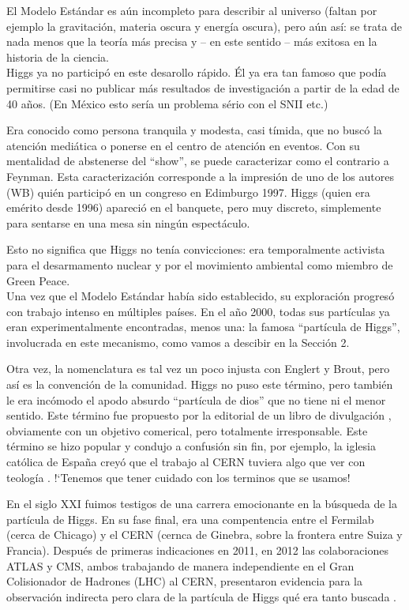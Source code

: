 \documentclass[12pt]{article}
\begin{document}
El Modelo Estándar es aún incompleto para describir al universo (faltan por ejemplo
la gravitaci\'on, materia oscura y energ\'ia oscura), pero
a\'un as\'i: se trata de nada menos que la teor\'ia m\'as precisa
y -- en este sentido -- m\'as exitosa en la historia de la ciencia.\\
 
Higgs ya no particip\'o en este desarollo r\'apido. \'El ya era
tan famoso que pod\'ia permitirse casi no publicar m\'as resultados
de investigaci\'on a partir de la edad de 40 a\~{n}os.
(En M\'exico esto ser\'ia un problema s\'erio con el SNII etc.)
 
Era conocido como persona tranquila y modesta, casi t\'imida,
que no busc\'o la atenci\'on medi\'atica o ponerse en el centro de atenci\'on en eventos. Con su mentalidad de abstenerse del
``show'', se puede caracterizar como el contrario a Feynman.
Esta caracterizaci\'on corresponde a la impresi\'on de uno de los
autores (WB) qui\'en particip\'o en un congreso en Edimburgo 1997.
Higgs (quien era em\'erito desde 1996) apareci\'o en el banquete,
pero muy discreto, simplemente para sentarse en una mesa sin
ning\'un espect\'aculo.

Esto no significa que Higgs no ten\'ia convicciones: era
temporalmente activista para el desarmamento nuclear y
por el movimiento ambiental como miembro de Green Peace. \\

Una vez que el Modelo Estándar había sido establecido, su exploraci\'on
progresó con trabajo intenso en m\'ultiples pa\'ises.
En el a\~no 2000, todas sus part\'iculas ya eran experimentalmente
encontradas, menos una: la famosa ``part\'icula de Higgs'', involucrada
en este mecanismo, como vamos a descibir en la Secci\'on 2.

Otra vez, la nomenclatura es tal vez un poco injusta con Englert y
Brout, pero as\'i es la convenci\'on de la comunidad.
Higgs no puso este t\'ermino, pero tambi\'en le era incómodo el
apodo absurdo ``part\'icula de dios'' que no tiene ni el menor sentido.
Este término fue propuesto por la editorial de un libro de divulgaci\'on \cite{Lederman},
obviamente con un objetivo comerical, pero totalmente irresponsable.
Este t\'ermino se hizo popular y condujo a confusi\'on sin fin,
por ejemplo, la iglesia cat\'olica de Espa\~na crey\'o que el trabajo al
CERN tuviera algo que ver con teolog\'ia \cite{boson}. !`Tenemos que
tener cuidado con los terminos que se usamos!

En el siglo XXI fuimos testigos de una carrera emocionante en la
b\'usqueda de la part\'icula de Higgs. En su fase final, era una
compentencia entre el Fermilab (cerca de Chicago) y el CERN
(cernca de Ginebra, sobre la frontera entre Suiza y Francia).
Despu\'es de primeras indicaciones en 2011, en 2012 las
colaboraciones ATLAS y CMS, ambos trabajando de manera independiente
en el Gran Colisionador de Hadrones (LHC) al CERN, presentaron
evidencia para la observaci\'on indirecta pero clara de la
part\'icula de Higgs qu\'e era tanto buscada \cite{ATLASCMS}.
\end{document}
